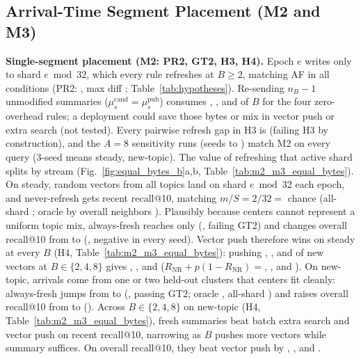 \subsection{Arrival-Time Segment Placement (M2 and M3)}
\label{sec:results_m2_m3}

\textbf{Single-segment placement (M2: PR2, GT2, H3, H4).} Epoch $e$ writes only to shard $e \bmod 32$, which every rule refreshes at $B \ge 2$, matching AF in all \RNumMTwoSeedStreamBudgetConds{} conditions (PR2: \RNumPredMTwoTiesGap{}, max diff \RNumPredMTwoTiesMaxAbs{}; Table~\ref{tab:hypotheses}). Re-sending $n_B - 1$ unmodified summaries ($\mu_s^{\text{cand}} = \mu_s^{\text{pub}}$) consumes \RNumMTwoUnmodShareBTwo{}, \RNumMTwoUnmodShareBFour{}, and \RNumMTwoUnmodShareBEight{} of $B$ for the four zero-overhead rules; a deployment could save those bytes or mix in vector push or extra search (not tested). Every pairwise refresh gap in H3 is \RNumHThreeGapZero{} (failing H3 by construction), and the $A = 8$ sensitivity runs (seeds \RNumSeedMin{} to \RNumSensSeedMax{}) match M2 on every query ($3$-seed means \RNumSensRecallMeanSteady{} steady, \RNumSensRecallMeanNewTopic{} new-topic). The value of refreshing that active shard splits by stream (Fig.~\ref{fig:equal_bytes_b}a,b, Table~\ref{tab:m2_m3_equal_bytes}). On steady, \RNumSteadyEpochInsertVecs{} random vectors from all topics land on shard $e \bmod 32$ each epoch, and never-refresh gets \RNumMTwoNRRecentSteady{} recent recall@10, matching $m / S = 2 / 32 = {}$\RNumChanceRecallMTwo{} chance (all-shard \RNumMTwoAllShardsRecentSteady{}; oracle by overall neighbors \RNumMTwoOracleRecentSteady{}). Plausibly because \RNumCentersPerSummary{} centers cannot represent a uniform topic mix, always-fresh reaches only \RNumMTwoAFRecentSteady{} (\RNumGateMTwoSteady{}, failing GT2) and changes overall recall@10 from \RNumMTwoNROverallSteady{} to \RNumMTwoAFOverallSteady{} (\RNumGateMTwoOverallSteady{}, negative in every seed). Vector push therefore wins on steady at every $B$ (H4, Table~\ref{tab:m2_m3_equal_bytes}): pushing \RNumMTwoPVShareBTwo{}, \RNumMTwoPVShareBFour{}, and \RNumMTwoPVShareBEight{} of new vectors at $B \in \{2, 4, 8\}$ gives \RNumMTwoPVRecentBTwoSteady{}, \RNumMTwoPVRecentBFourSteady{}, and \RNumMTwoPVRecentBEightSteady{} ($R_{\text{NR}} + p(1 - R_{\text{NR}}) = {}$\RNumMTwoPVPredRecentBTwoSteady{}, \RNumMTwoPVPredRecentBFourSteady{}, and \RNumMTwoPVPredRecentBEightSteady{}). On new-topic, arrivals come from one or two held-out clusters that \RNumCentersPerSummary{} centers fit cleanly: always-fresh jumps from \RNumMTwoNRRecentNewTopic{} to \RNumMTwoAFRecentNewTopic{} (\RNumGateMTwoNewTopic{}, passing GT2; oracle \RNumMTwoOracleRecentNewTopic{}, all-shard \RNumMTwoAllShardsRecentNewTopic{}) and raises overall recall@10 from \RNumMTwoNROverallNewTopic{} to \RNumMTwoAFOverallNewTopic{} (\RNumGateMTwoOverallNewTopic{}). Across $B \in \{2, 4, 8\}$ on new-topic (H4, Table~\ref{tab:m2_m3_equal_bytes}), fresh summaries beat batch extra search and vector push on recent recall@10, narrowing as $B$ pushes more vectors while \RNumOneSummary{} summary suffices. On overall recall@10, they beat vector push by \RNumHFourRefMinusPVOverallBTwoNewTopic{}, \RNumHFourRefMinusPVOverallBFourNewTopic{}, and \RNumHFourRefMinusPVOverallBEightNewTopic{}.

